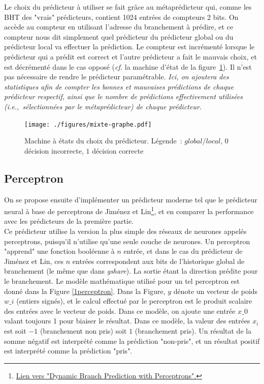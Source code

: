 \documentclass[a4paper]{article}
\begin{document}
\begin{enumerate}
Le choix du prédicteur à utiliser se fait grâce au métaprédicteur qui, comme les BHT des "vrais" prédicteurs, contient 1024 entrées de compteurs 2 bits. On accède au compteur en utilisant l'adresse du branchement à prédire, et ce compteur nous dit simplement quel prédicteur du prédicteur global ou du prédicteur local va effectuer la prédiction. Le compteur est incrémenté lorsque le prédicteur qui a prédit est correct et l'autre prédicteur a fait le mauvais choix, et est décrémenté dans le cas opposé (\emph{cf.} la machine d'état de la figure~\ref{mixte-graphe}). Il n'est pas nécessaire de rendre le prédicteur paramétrable. \textit{Ici, on ajoutera des statistiques afin de compter les bonnes et mauvaises prédictions de chaque prédicteur respectif, ainsi que le nombre de prédictions effectivement utilisées (i.e.,~sélectionnées par le métaprédicteur) de chaque prédicteur}.



\begin{figure}[hbt]\center\leavevmode
      \texttt{[image: ./figures/mixte-graphe.pdf]}
      \caption{Machine à états du choix du prédicteur.
      Légende~: $global/local$, $0$ décision incorrecte, $1$ décision correcte}
      \label{mixte-graphe}
      \end{figure}
\end{enumerate}


\subsection{Perceptron}

On se propose ensuite d'implémenter un prédicteur moderne tel que le prédicteur neural à base de perceptrons de Jiménez et Lin\footnote{\href{https://www.cs.cmu.edu/afs/cs/academic/class/15740-f18/www/papers/hpca01-jiminez-perceptron.pdf}{Lien vers "Dynamic Branch Prediction with Perceptrons".}}, et en comparer la performance avec les prédicteurs de la première partie. \\

Ce prédicteur utilise la version la plus simple des réseaux de neurones appelés perceptrons, puisqu'il n'utilise qu'une seule couche de neurones. Un perceptron "apprend" une fonction booléenne à $n$ entrée, et dans le cas du prédicteur de Jiménez et Lin, ces $n$ entrées correspondent aux bits de l'historique global de branchement (le même que dans \textit{gshare}). La sortie étant la direction prédite pour le branchement. Le modèle mathématique utilisé pour un tel perceptron est donné dans la Figure \ref{1perceptron}. Dans la Figure, $y$ dénote un vecteur de poids $w\_i$ (entiers signés), et le calcul effectué par le perceptron est le produit scalaire des entrées avec le vecteur de poids. Dans ce modèle, on ajoute une entrée $x\_0$ valant toujours 1 pour biaiser le résultat. Dans ce modèle, la valeur des entrées $x_i$ est soit $-1$ (branchement non pris) soit $1$ (branchement pris). Un résultat de la somme négatif est interprété comme la prédiction "non-pris", et un résultat positif est interprété comme la prédiction "pris".
\end{document}
